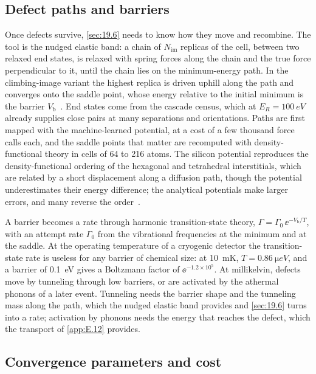 \subsection{Defect paths and barriers}

Once defects survive, \cref{sec:19.6} needs to know how they move and recombine. The tool is the nudged elastic band: a chain of $N_{\mathrm{im}}$ replicas of the cell, between two relaxed end states, is relaxed with spring forces along the chain and the true force perpendicular to it, until the chain lies on the minimum-energy path. In the climbing-image variant the highest replica is driven uphill along the path and converges onto the saddle point, whose energy relative to the initial minimum is the barrier $V_{\mathrm{b}}$~\cite{henkelman2000climbing}. End states come from the cascade census, which at $E_R = \SI{100}{eV}$ already supplies close pairs at many separations and orientations. Paths are first mapped with the machine-learned potential, at a cost of a few thousand force calls each, and the saddle points that matter are recomputed with density-functional theory in cells of 64 to 216 atoms. The silicon potential reproduces the density-functional ordering of the hexagonal and tetrahedral interstitials, which are related by a short displacement along a diffusion path, though the potential underestimates their energy difference; the analytical potentials make larger errors, and many reverse the order~\cite[Sect.~III\,E]{bartok2018machine}.

A barrier becomes a rate through harmonic transition-state theory, $\varGamma = \varGamma_0\,\ee^{-V_{\mathrm{b}}/T}$, with an attempt rate $\varGamma_0$ from the vibrational frequencies at the minimum and at the saddle. At the operating temperature of a cryogenic detector the transition-state rate is useless for any barrier of chemical size: at \SI{10}{mK}, $T = \SI{0.86}{\micro eV}$, and a barrier of \SI{0.1}{eV} gives a Boltzmann factor of $\ee^{-1.2\times10^5}$. At millikelvin, defects move by tunneling through low barriers, or are activated by the athermal phonons of a later event. Tunneling needs the barrier shape and the tunneling mass along the path, which the nudged elastic band provides and \cref{sec:19.6} turns into a rate; activation by phonons needs the energy that reaches the defect, which the transport of \cref{app:E.12} provides.

\subsection{Convergence parameters and cost}

